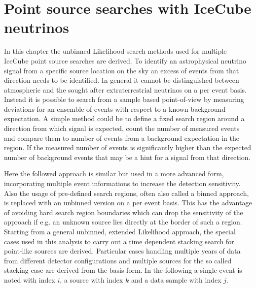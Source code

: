 \chapter{Point source searches with IceCube neutrinos}
In this chapter the unbinned Likelihood search methods used for multiple IceCube point source searches are derived.
To identify an astrophysical neutrino signal from a specific source location on the sky an excess of events from that direction needs to be identified.
In general it cannot be distinguished between atmospheric and the sought after extraterrestrial neutrinos on a per event basis.
Instead it is possible to search from a sample based point-of-view by measuring deviations for an ensemble of events with respect to a known background expectation.
A simple method could be to define a fixed search region around a direction from which signal is expected, count the number of measured events and compare them to number of events from a background expectation in the region.
If the measured number of events is significantly higher than the expected number of background events that may be a hint for a signal from that direction.

Here the followed approach is similar but used in a more advanced form, incorporating multiple event informations to increase the detection sensitivity.
Also the usage of pre-defined search regions, often also called a binned approach, is replaced with an unbinned version on a per event basis.
This has the advantage of avoiding hard search region boundaries which can drop the sensitivity of the approach if e.g. an unknown source lies directly at the border of such a region.
Starting from a general unbinned, extended Likelihood approach, the special cases used in this analysis to carry out a time dependent stacking search for point-like sources are derived.
Particular cases handling multiple years of data from different detector configurations and multiple sources for the so called stacking case are derived from the basis form.
In the following a single event is noted with index $i$, a source with index $k$ and a data sample with index $j$.



